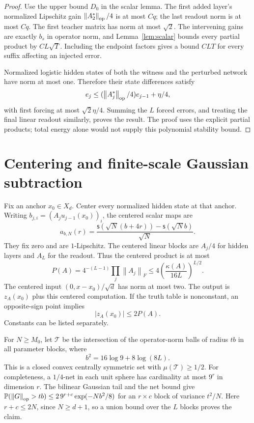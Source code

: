\documentclass[11pt]{article}
\theoremstyle{remark}\newtheorem{remark}[theorem]{Remark}
\newcommand{\Prb}{\mathbb P}
\newcommand{\norm}[1]{\left\lVert #1\right\rVert}
\newcommand{\sig}{\mathsf s}
\begin{document}
\begin{proof}
Use the upper bound $D_0$ in the scalar lemma. The first added layer's
normalized Lipschitz gain $\norm{A_2^*}_{\rm op}/4$ is at most $Cq$;
the last readout norm is at most $Cq$. The first teacher matrix has norm
at most $\sqrt2$. The intervening gains are exactly $b_s$ in operator
norm, and Lemma~\ref{lem:scalar} bounds every partial product by
$CL\sqrt T$. Including the endpoint factors gives a bound $CLT$ for
every suffix affecting an injected error.

Normalized logistic hidden states of both the witness and the perturbed
network have norm at most one. Therefore their state differences satisfy
\[
 e_j\le(\norm{A_j^*}_{\rm op}/4)e_{j-1}+\eta/4,
\]
with first forcing at most $\sqrt2\eta/4$. Summing the $L$ forced errors,
and treating the final linear readout similarly, proves the result.
The proof uses the explicit partial products; total energy alone would
not supply this polynomial stability bound.
\end{proof}

\section{Centering and finite-scale Gaussian subtraction}

Fix an anchor $x_0\in X_d$. Center every normalized hidden state at that
anchor. Writing $b_{j,i}=(A_j u_{j-1}(x_0))_i$, the centered scalar maps
are
\[
 a_{b,N}(r)=\frac{\sig(\sqrt N(b+4r))-\sig(\sqrt N b)}{\sqrt N}.
\]
They fix zero and are $1$-Lipschitz. The centered linear blocks are
$A_j/4$ for hidden layers and $A_L$ for the readout. Thus the centered
product is at most
\begin{equation}\label{eq:centerproduct}
 P(A)=4^{-(L-1)}\prod_j\norm{A_j}_F
 \le4\left(\frac{\kappa(A)}{16L}\right)^{L/2}.
\end{equation}
The centered input $(0,x-x_0)/\sqrt d$ has norm at most two.
The output is $z_A(x_0)$ plus this centered computation. If the truth
table is nonconstant, an opposite-sign point implies
\begin{equation}\label{eq:offset}
 |z_A(x_0)|\le2P(A).
\end{equation}
Constants can be listed separately.

For $N\ge M_0$, let $\mathcal T$ be the intersection of the operator-norm
balls of radius $tb$ in all parameter blocks, where
\[
 b^2=16\log9+8\log(8L).
\]
This is a closed convex centrally symmetric set with $\mu(\mathcal T)
\ge1/2$. For completeness, a $1/4$-net in each unit sphere has cardinality
at most $9^r$ in dimension $r$. The bilinear Gaussian tail and the net
bound give
$\Prb(\norm G_{\rm op}>tb)\le2\,9^{r+c}\exp(-Nb^2/8)$ for an
$r\times c$ block of variance $t^2/N$. Here $r+c\le2N$, since
$N\ge d+1$, so a union bound over the $L$ blocks proves the claim.
\end{document}
